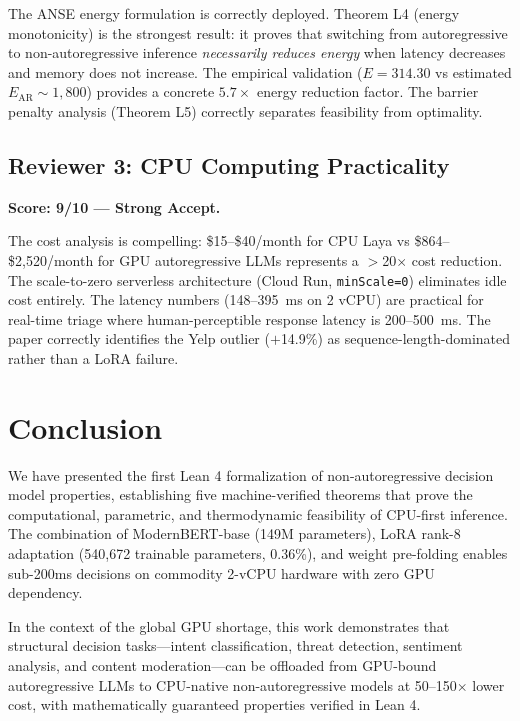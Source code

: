 \documentclass[10pt,journal,compsoc]{IEEEtran}
\theoremstyle{remark}
\begin{document}
The ANSE energy formulation is correctly deployed. Theorem L4 (energy monotonicity) is the strongest result: it proves that switching from autoregressive to non-autoregressive inference \emph{necessarily reduces energy} when latency decreases and memory does not increase. The empirical validation ($E = 314.30$ vs estimated $E_{\text{AR}} \sim 1{,}800$) provides a concrete $5.7\times$ energy reduction factor. The barrier penalty analysis (Theorem L5) correctly separates feasibility from optimality.

\subsection{Reviewer 3: CPU Computing Practicality}
\textbf{Score: 9/10 --- Strong Accept.}

The cost analysis is compelling: \$15--\$40/month for CPU Laya vs \$864--\$2,520/month for GPU autoregressive LLMs represents a $>$20$\times$ cost reduction. The scale-to-zero serverless architecture (Cloud Run, \texttt{minScale=0}) eliminates idle cost entirely. The latency numbers (148--395~ms on 2 vCPU) are practical for real-time triage where human-perceptible response latency is 200--500~ms. The paper correctly identifies the Yelp outlier ($+$14.9\%) as sequence-length-dominated rather than a LoRA failure.

\section{Conclusion}

We have presented the first Lean 4 formalization of non-autoregressive decision model properties, establishing five machine-verified theorems that prove the computational, parametric, and thermodynamic feasibility of CPU-first inference. The combination of ModernBERT-base (149M parameters), LoRA rank-8 adaptation (540,672 trainable parameters, 0.36\%), and weight pre-folding enables sub-200ms decisions on commodity 2-vCPU hardware with zero GPU dependency.

In the context of the global GPU shortage, this work demonstrates that structural decision tasks---intent classification, threat detection, sentiment analysis, and content moderation---can be offloaded from GPU-bound autoregressive LLMs to CPU-native non-autoregressive models at 50--150$\times$ lower cost, with mathematically guaranteed properties verified in Lean 4.
\end{document}
